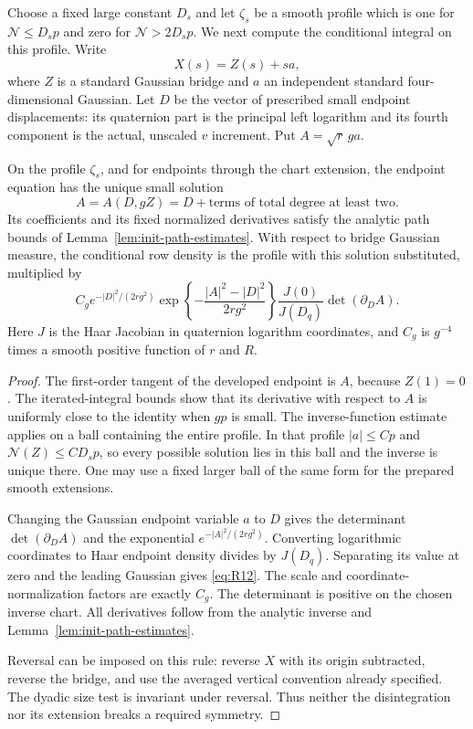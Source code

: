 Choose a fixed large constant $D_s$ and let $\zeta_s$ be a smooth profile
which is one for $\mathcal N\le D_sp$ and zero for
$\mathcal N>2D_sp$.  We next compute the conditional integral on this
profile.  Write
\[
 X(s)=Z(s)+sa,
\]
where $Z$ is a standard Gaussian bridge and $a$ an independent standard
four-dimensional Gaussian.  Let $D$ be the vector of prescribed small
endpoint displacements: its quaternion part is the principal left
logarithm and its fourth component is the actual, unscaled $v$
increment.  Put $A=\sqrt r\,g a$.

\begin{lemma}
\label{lem:init-endpoint}
On the profile $\zeta_s$, and for endpoints through the chart extension,
the endpoint equation has the unique small solution
\[
 A=A(D,gZ)=D+\text{terms of total degree at least two}.
\]
Its coefficients and its fixed normalized derivatives satisfy the
analytic path bounds of Lemma~\ref{lem:init-path-estimates}.  With respect
to bridge Gaussian measure, the conditional row density is the profile
with this solution substituted, multiplied by
\begin{equation}
 C_g e^{-|D|^2/(2rg^2)}
 \exp\!\left\{-\frac{|A|^2-|D|^2}{2rg^2}\right\}
 \frac{J(0)}{J(D_q)}\det(\partial_D A).
 \label{eq:R12}
\end{equation}
Here $J$ is the Haar Jacobian in quaternion logarithm coordinates, and
$C_g$ is $g^{-4}$ times a smooth positive function of $r$ and $R$.
\end{lemma}

\begin{proof}
The first-order tangent of the developed endpoint is $A$, because
$Z(1)=0$.  The iterated-integral bounds show that its derivative with
respect to $A$ is uniformly close to the identity when $gp$ is small.
The inverse-function estimate applies on a ball containing the entire
profile.  In that profile $|a|\le Cp$ and
$\mathcal N(Z)\le CD_sp$, so every possible solution lies in this
ball and the inverse is unique there.  One may use a fixed larger ball
of the same form for the prepared smooth extensions.

Changing the Gaussian endpoint variable $a$ to $D$ gives the determinant
$\det(\partial_D A)$ and the exponential $e^{-|A|^2/(2rg^2)}$.
Converting logarithmic coordinates to Haar endpoint density divides by
$J(D_q)$.  Separating its value at zero and the leading Gaussian gives
\eqref{eq:R12}.  The scale and coordinate-normalization factors are
exactly $C_g$.  The determinant is positive on the chosen inverse chart.
All derivatives follow from the analytic inverse and
Lemma~\ref{lem:init-path-estimates}.

Reversal can be imposed on this rule: reverse $X$ with its origin
subtracted, reverse the bridge, and use the averaged vertical convention
already specified.  The dyadic size test is invariant under reversal.
Thus neither the disintegration nor its extension breaks a required
symmetry.
\end{proof}

